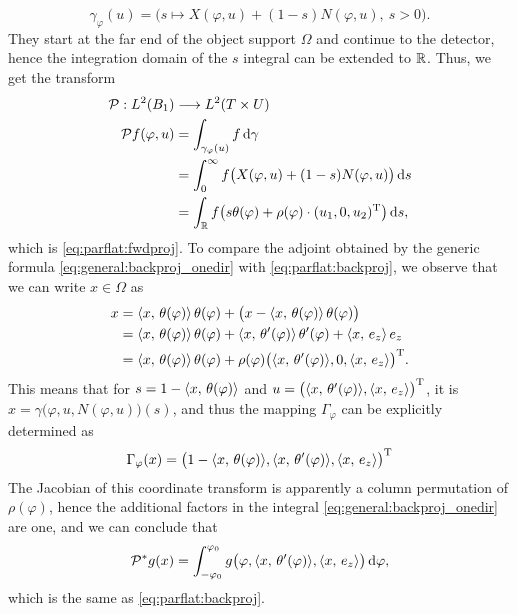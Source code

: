 \documentclass{amsart}
\renewcommand*{\phi}{\varphi}
\begin{document}
%
\begin{equation*}
 \gamma_\phi(u) = \big( s \mapsto X(\phi, u) + (1-s) N(\phi, u),\ s > 0 \big).
\end{equation*}
%
They start at the far end of the object support $\Omega$ and continue to the detector, hence the integration domain of the $s$ 
integral can be extended to ${\mathbb{R}}$. Thus, we get the transform
%
\begin{align*}
 \OPP: L^2(B_1) & \Lto L^2(T \times U) \\
 \OPP f(\phi, u) 
 &= \int_{\gamma_\phi(u)} f\, \D \gamma \\
 &= \int_0^\infty f\big(X(\phi, u) + (1-s) N(\phi, u)\big)\, \D s \\
 &= \int_\RR f\big(s \theta(\phi) + \rho(\phi) \cdot \TRANSP{(u_1, 0, u_2)}\big)\, \D s,
\end{align*}
%
which is \eqref{eq:parflat:fwdproj}. To compare the adjoint obtained by the generic formula \eqref{eq:general:backproj_onedir} with 
\eqref{eq:parflat:backproj}, we observe that we can write $x \in \Omega$ as
%
\begin{align*}
 x 
 &= \INNER{x}{\theta(\phi)}\, \theta(\phi) + \big(x - \INNER{x}{\theta(\phi)}\, \theta(\phi)\big) \\
 &= \INNER{x}{\theta(\phi)}\, \theta(\phi) + \INNER{x}{\theta'(\phi)}\, \theta'(\phi) + \INNER{x}{e_z}\, e_z \\
 &= \INNER{x}{\theta(\phi)}\, \theta(\phi) + \rho(\phi) \TRANSP{\big(\INNER{x}{\theta'(\phi)}, 0, \INNER{x}{e_z}\big)}.
\end{align*}
%
This means that for $s = 1 - \INNER{x}{\theta(\phi)}$ and $u = \TRANSP{\big(\INNER{x}{\theta'(\phi)}, \INNER{x}{e_z}\big)}$, it is 
$x = \gamma\big(\phi, u, N(\phi, u)\big)(s)$, and thus the mapping $\Gamma_\phi$ can be explicitly determined as
%
\begin{equation*}
 \Gamma_\phi(x) = \TRANSP{\big(1 - \INNER{x}{\theta(\phi)}, \INNER{x}{\theta'(\phi)}, \INNER{x}{e_z}\big)}
\end{equation*}
%
The Jacobian of this coordinate transform is apparently a column permutation of $\rho(\phi)$, hence the additional factors in the integral 
\eqref{eq:general:backproj_onedir} are one, and we can conclude that
%
\begin{equation*}
 \DUALOPP g(x) = \int_{-\phi_0}^{\phi_0} g\big(\phi, \INNER{x}{\theta'(\phi)}, \INNER{x}{e_z}\big)\, \D\phi,
\end{equation*}
%
which is the same as \eqref{eq:parflat:backproj}.%
\vspace{5ex}%
\end{document}
